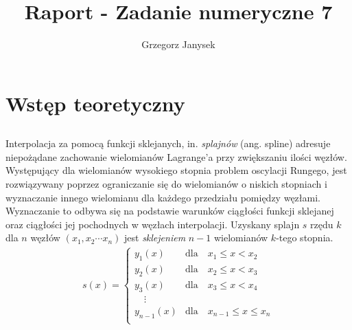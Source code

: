\documentclass[11pt]{extarticle}
\author{Grzegorz Janysek}
\title{Raport - Zadanie numeryczne 7}
\begin{document}
	\maketitle

	\section{Wstęp teoretyczny}

	\subsection{}
	Interpolacja za pomocą funkcji sklejanych, in. \textit{splajnów} (ang. spline) adresuje niepożądane zachowanie wielomianów Lagrange'a przy zwiększaniu ilości węzłów.
	Występujący dla wielomianów wysokiego stopnia problem oscylacji Rungego, jest rozwiązywany poprzez ograniczanie się do wielomianów o niskich stopniach i wyznaczanie innego wielomianu dla każdego przedziału pomiędzy węzłami.
	Wyznaczanie to odbywa się na podstawie warunków ciągłości funkcji sklejanej oraz ciągłości jej pochodnych w węzłach interpolacji.
	Uzyskany splajn \(s\) rzędu \(k\) dla \(n\) węzłów \((x_1, x_2 \dotsm x_n)\) jest \textit{sklejeniem} \(n-1\) wielomianów \(k\)-tego stopnia.
	\begin{align}
		s(x) =
		\left\{
			\begin{array}{ll}
				y_{1}(x)  & \mbox{dla} \quad x_1 \leq x < x_2 \\
				y_{2}(x)  & \mbox{dla} \quad x_2 \leq x < x_3 \\
				y_{3}(x)  & \mbox{dla} \quad x_3 \leq x < x_4 \\
				\quad \vdots \\
				y_{n-1}(x)  & \mbox{dla} \quad x_{n-1} \leq x \leq x_n \\
			\end{array}
		\right.
	\end{align}
	
\end{document}
